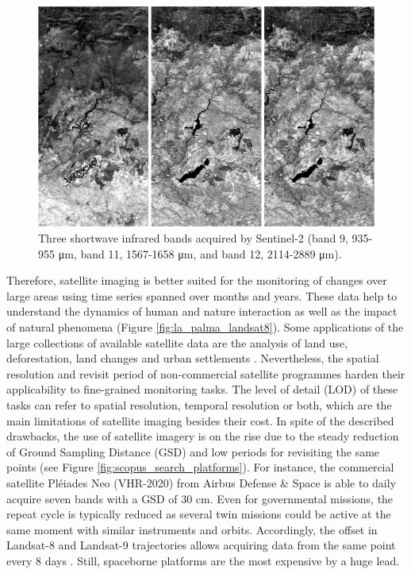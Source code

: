 \begin{figure}[!ht]
	\includegraphics{figs/introduction/sentinel2_bands.png}
	\caption{Three shortwave infrared bands acquired by Sentinel-2 (band 9, 935-955 \si{\micro\meter}, band 11, 1567-1658 \si{\micro\meter}, and band 12, 2114-2889 \si{\micro\meter}). }
    \label{fig:sentinel2}
\end{figure}

Therefore, satellite imaging is better suited for the monitoring of changes over large areas using time series spanned over months and years. These data help to understand the dynamics of human and nature interaction as well as the impact of natural phenomena (Figure \ref{fig:la_palma_landsat8}). Some applications of the large collections of available satellite data are the analysis of land use, deforestation, land changes and urban settlements \cite{asokan_change_2019}. Nevertheless, the spatial resolution and revisit period of non-commercial satellite programmes harden their applicability to fine-grained monitoring tasks. The level of detail (LOD) of these tasks can refer to spatial resolution, temporal resolution or both, which are the main limitations of satellite imaging besides their cost. In spite of the described drawbacks, the use of satellite imagery is on the rise due to the steady reduction of Ground Sampling Distance (GSD) and low periods for revisiting the same points (see Figure \ref{fig:scopus_search_platforms}). For instance, the commercial satellite Pléiades Neo (VHR-2020) from Airbus Defense \& Space \cite{airbus_pleiades_2021} is able to daily acquire seven bands with a GSD of 30 \si{\centi\meter}. Even for governmental missions, the repeat cycle is typically reduced as several twin missions could be active at the same moment with similar instruments and orbits. Accordingly, the offset in Landsat-8 and Landsat-9 trajectories allows acquiring data from the same point every 8 days \cite{masek_landsat_2020}. Still, spaceborne platforms are the most expensive by a huge lead.

